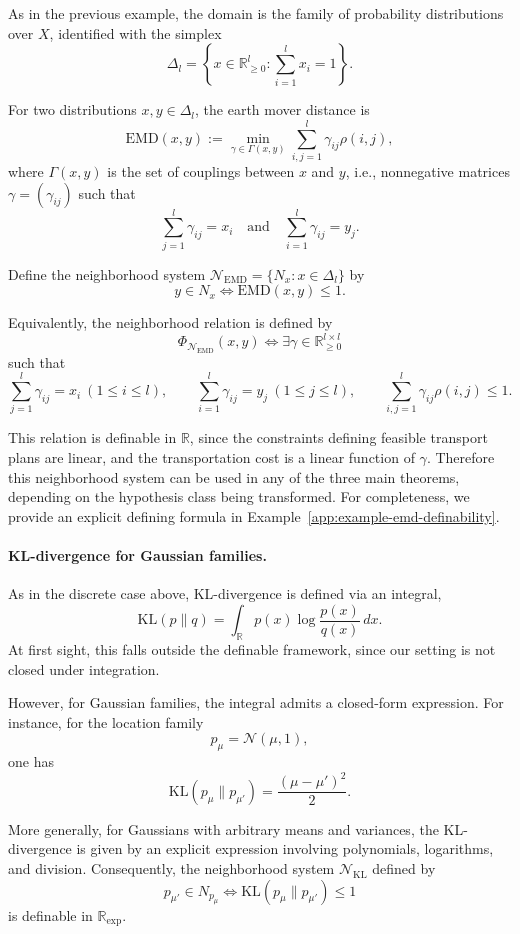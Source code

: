 \documentclass[11pt]{article}
\theoremstyle{plain}
\theoremstyle{definition}
\theoremstyle{remark}
\newcommand{\R}{\mathbb{R}}
\begin{document}
As in the previous example, the domain is the family of probability
distributions over \(X\), identified with the simplex
\[
  \Delta_l
  =
  \left\{
    x\in \R_{\ge 0}^l : \sum_{i=1}^l x_i=1
  \right\}.
\]

For two distributions \(x,y\in\Delta_l\), the earth mover distance is
\[
  \mathrm{EMD}(x,y)
  :=
  \min_{\gamma \in \Gamma(x,y)}
  \sum_{i,j=1}^l \gamma_{ij}\rho(i,j),
\]
where \(\Gamma(x,y)\) is the set of couplings between \(x\) and \(y\), i.e.,
nonnegative matrices \(\gamma=(\gamma_{ij})\) such that
\[
  \sum_{j=1}^l \gamma_{ij}=x_i
  \quad\text{and}\quad
  \sum_{i=1}^l \gamma_{ij}=y_j.
\]

Define the neighborhood system
\(\mathcal N_{\mathrm{EMD}}=\{N_x:x\in\Delta_l\}\) by
\[
  y\in N_x
  \iff
  \mathrm{EMD}(x,y)\le 1.
\]

Equivalently, the neighborhood relation is defined by
\[
  \Phi_{\mathcal N_{\mathrm{EMD}}}(x,y)
  \iff
  \exists \gamma\in\R_{\ge 0}^{l\times l}
\]
such that
\[
  \sum_{j=1}^l \gamma_{ij}=x_i \ (1\le i\le l),
  \qquad
  \sum_{i=1}^l \gamma_{ij}=y_j \ (1\le j\le l),
  \qquad
  \sum_{i,j=1}^l \gamma_{ij}\rho(i,j)\le 1.
\]

This relation is definable in \(\R\), since the constraints defining feasible
transport plans are linear, and the transportation cost is a linear function
of \(\gamma\). Therefore this neighborhood system can be used in any of the
three main theorems, depending on the hypothesis class being transformed. For
completeness, we provide an explicit defining formula in
Example~\ref{app:example-emd-definability}.

\paragraph{KL-divergence for Gaussian families.}

As in the discrete case above, KL-divergence is defined via an integral,
\[
\mathrm{KL}(p\|q)
=
\int_{\R} p(x)\log\frac{p(x)}{q(x)}\,dx.
\]
At first sight, this falls outside the definable framework, since our setting
is not closed under integration.

However, for Gaussian families, the integral admits a closed-form expression.
For instance, for the location family
\[
p_\mu=\mathcal N(\mu,1),
\]
one has
\[
\mathrm{KL}(p_\mu\|p_{\mu'})
=
\frac{(\mu-\mu')^2}{2}.
\]

More generally, for Gaussians with arbitrary means and variances, the
KL-divergence is given by an explicit expression involving polynomials,
logarithms, and division. Consequently, the neighborhood system
\(\mathcal N_{\mathrm{KL}}\) defined by
\[
  p_{\mu'}\in N_{p_\mu}
  \iff
  \mathrm{KL}(p_\mu\|p_{\mu'})\le 1
\]
is definable in \(\R_{\exp}\).
\end{document}
